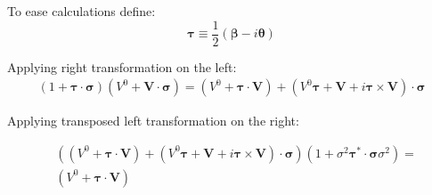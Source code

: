 \documentclass[11pt]{article}
\begin{document}
To ease calculations define:
\begin{equation}
\boldsymbol{\tau} \equiv
  \frac{1}{2} \left(
    \boldsymbol{\beta} - i \boldsymbol{\theta} \right)
\end{equation}

Applying right transformation on the left:
\begin{equation}
\begin{split}
\left(
  1 +
  \boldsymbol{\tau} \cdot \boldsymbol{\sigma}
\right) \left( V^0 + \mathbf{V} \cdot \boldsymbol{\sigma} \right) =
\left( V^0 + \boldsymbol{\tau} \cdot \mathbf{V} \right) +
\left( V^0 \boldsymbol{\tau} + \mathbf{V} +
  i \boldsymbol{\tau} \times \mathbf{V} \right) \cdot
  \boldsymbol{\sigma}
\end{split}
\end{equation}

Applying transposed left transformation on the right:

\begin{equation}
\begin{split}
& \left(
  \left( V^0 + \boldsymbol{\tau} \cdot \mathbf{V} \right) +
  \left( V^0 \boldsymbol{\tau} + \mathbf{V} +
  i \boldsymbol{\tau} \times \mathbf{V} \right) \cdot
  \boldsymbol{\sigma}
\right) \left(
  1 + \sigma^2 \boldsymbol{\tau}^* \cdot \boldsymbol{\sigma} \sigma^2 \right) = \\
& \left( V^0 + \boldsymbol{\tau} \cdot \mathbf{V} \right)
\end{split}
\end{equation}
\end{document}
